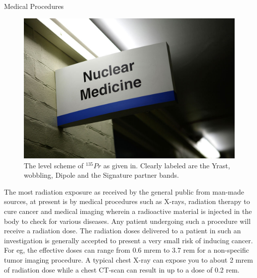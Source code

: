 \documentclass[%
 amsmath,amssymb,
]{article}
\begin{document}
\begin{section}{Medical Procedures}
\begin{figure}
\begin{center}
\includegraphics[width = \textwidth]{nuclear-med}
\caption{The level scheme of $^{135}Pr$ as given in. Clearly labeled are the Yrast, wobbling, Dipole and the Signature partner bands.}
\end{center}
\end{figure}

The most radiation exposure as received by the general public from man-made sources, at present is by medical procedures such as X-rays, radiation therapy to cure cancer and medical imaging wherein a radioactive material is injected in the body to check for various diseases. Any patient undergoing such a procedure will receive a radiation dose. The radiation doses delivered to a patient in such an investigation is generally accepted to present a very small risk of inducing cancer. For eg, the effective doses can range from 0.6 mrem to 3.7 rem for a non-specific tumor imaging procedure. A typical chest X-ray can expose you to about 2 mrem of radiation dose while a chest CT-scan can result in up to a dose of 0.2 rem.

\end{section}
\end{document}
